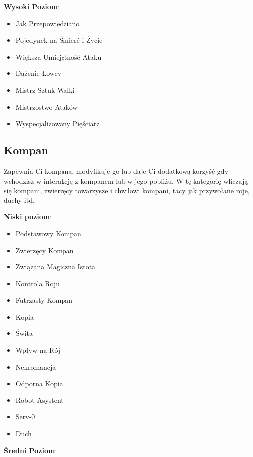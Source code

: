 \textbf{Wysoki Poziom}:

\begin{itemize}
\item Jak Przepowiedziano
\item Pojedynek na Śmierć i Życie
\item Większa Umiejętność Ataku
\item Dążenie Łowcy
\item Mistrz Sztuk Walki
\item Mistrzostwo Ataków
\item Wyspecjalizowany Pięściarz
\end{itemize}

\subsection{Kompan}

Zapewnia Ci kompana, modyfikuje go lub daje Ci dodatkową korzyść gdy wchodzisz w interakcję z kompanem lub w jego pobliżu. W tę kategorię wliczają się kompani, zwierzęcy towarzysze i chwilowi kompani, tacy jak przywołane roje, duchy itd.

\textbf{Niski poziom}:

\begin{itemize}
\item Podstawowy Kompan
\item Zwierzęcy Kompan
\item Związana Magiczna Istota
\item Kontrola Roju
\item Futrzasty Kompan
\item Kopia
\item Świta
\item Wpływ na Rój
\item Nekromancja
\item Odporna Kopia
\item Robot-Asystent
\item Serv-0
\item Duch 
\end{itemize}

\textbf{Średni Poziom}:

